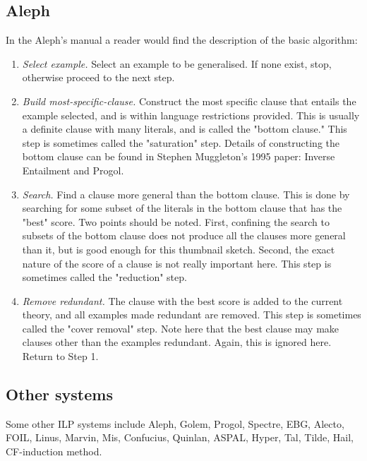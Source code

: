 \subsection{Aleph}
In the Aleph's manual\cite{aleph2007} a reader would find the description of the basic algorithm:
\begin{enumerate}
\item \emph{Select example.} Select an example to be generalised. If none exist, stop, otherwise proceed to the next step.
\item \emph{Build most-specific-clause.} Construct the most specific clause that entails the example selected, and is within language restrictions provided. This is usually a definite clause with many literals, and is called the "bottom clause." This step is sometimes called the "saturation" step. Details of constructing the bottom clause can be found in Stephen Muggleton's 1995 paper: Inverse Entailment and Progol\cite{muggleton1995}.
\item \emph{Search.} Find a clause more general than the bottom clause. This is done by searching for some subset of the literals in the bottom clause that has the "best" score. Two points should be noted. First, confining the search to subsets of the bottom clause does not produce all the clauses more general than it, but is good enough for this thumbnail sketch. Second, the exact nature of the score of a clause is not really important here. This step is sometimes called the "reduction" step.
\item \emph{Remove redundant.} The clause with the best score is added to the current theory, and all examples made redundant are removed. This step is sometimes called the "cover removal" step. Note here that the best clause may make clauses other than the examples redundant. Again, this is ignored here. Return to Step 1.
\end{enumerate}

\subsection{Other systems}
Some other ILP systems include Aleph, Golem, Progol,
Spectre, EBG, Alecto, FOIL, Linus, Marvin, Mis, Confucius, Quinlan, ASPAL, Hyper, Tal, Tilde, Hail, CF-induction method.

